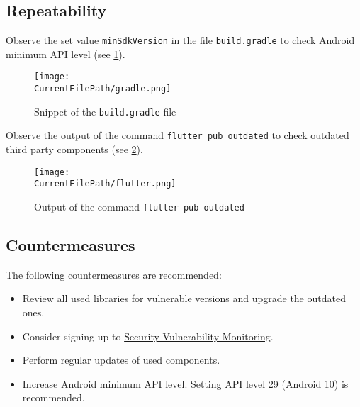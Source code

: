 \subsection*{Repeatability}

Observe the set value \texttt{minSdkVersion} in the file \texttt{build.gradle} to check Android minimum API level (see \cref{figure:gradle}).

\begin{figure}[H]
\centering
\texttt{[image: \\CurrentFilePath/gradle.png]}
\caption{Snippet of the \texttt{build.gradle} file}
\label{figure:gradle}
\end{figure}

Observe the output of the command \texttt{flutter pub outdated} to check outdated third party components (see \cref{figure:flutter}).

\begin{figure}[H]
\centering
\texttt{[image: \\CurrentFilePath/flutter.png]}
\caption{Output of the command \texttt{flutter pub outdated}}
\label{figure:flutter}
\end{figure}
 
\pagebreak
\subsection*{Countermeasures}

The following countermeasures are recommended:

\begin{itemize}
    \item Review all used libraries for vulnerable versions and upgrade the outdated ones.
    \item Consider signing up to \href{https://svm.cert.siemens.com/portal/}{Security Vulnerability Monitoring}.
    \item Perform regular updates of used components.
    \item Increase Android minimum API level. Setting API level 29 (Android 10) is recommended.
\end{itemize}


